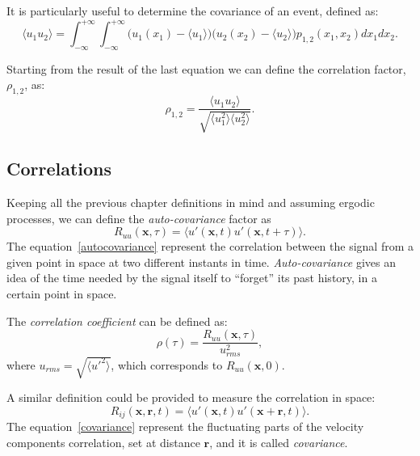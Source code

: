 It is particularly useful to determine the covariance of an event, defined as:
\begin{equation*}
\langle u_{1}u_{2} \rangle = \int_{-\infty}^{+\infty} \int_{-\infty}^{+\infty} \big( u_{1}(x_{1}) - \langle u_{1} \rangle \big) \big( u_{2}(x_{2}) - \langle u_{2} \rangle \big) p_{1,2}(x_{1},x_{2}) dx_{1} dx_{2}.
\end{equation*}
\par
Starting from the result of the last equation we can define the correlation factor, $\rho_{1,2}$, as:
\begin{equation*}
\rho_{1,2} = \frac{\langle u_{1} u_{2} \rangle}{\sqrt{\langle u_{1}^{2} \rangle \langle u_{2}^{2} \rangle}}.
\end{equation*}



\subsection{Correlations}

Keeping all the previous chapter definitions in mind and assuming ergodic processes, we can define the \emph{auto-covariance} factor as 
\begin{equation}
R_{uu}(\mathbf{x},\tau) = \langle u'(\mathbf{x},t) u'(\mathbf{x},t+\tau) \rangle.
\label{autocovariance}
\end{equation}
The equation~\ref{autocovariance} represent the correlation between the signal from a given point in space at two different instants in time. \emph{Auto-covariance} gives an idea of the time needed by the signal itself to ``forget'' its past history, in a certain point in space. \par
The \emph{correlation coefficient} can be defined as:
\begin{equation*}
\rho(\tau) = \frac{R_{uu}(\mathbf{x},\tau)}{u_{rms}^{2}},
\end{equation*}
where $u_{rms}= \sqrt{\langle u'^{2} \rangle}$, which corresponds to $R_{uu}(\mathbf{x},0)$.\par

A similar definition could be provided to measure the correlation in space:
\begin{equation}
R_{ij}(\mathbf{x},\mathbf{r},t) = \langle u'(\mathbf{x},t) u'(\mathbf{x}+\mathbf{r},t) \rangle.
\label{covariance}
\end{equation}
The equation~\ref{covariance} represent the fluctuating parts of the velocity components correlation, set at distance $\mathbf{r}$, and it is called \emph{covariance}.\par
 



